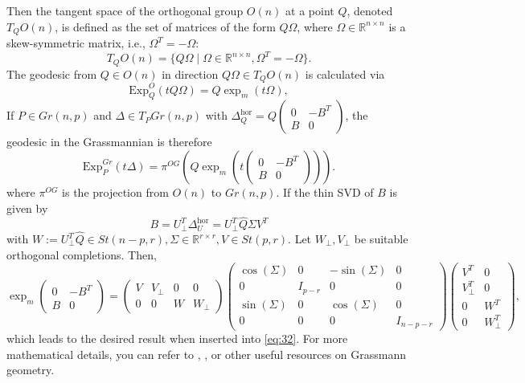 Then the tangent space of the orthogonal group \( O(n) \) at a point \( Q \), denoted \( T_Q O(n) \), is defined as the set of matrices of the form \( Q\Omega \), where \( \Omega \in \mathbb{R}^{n \times n} \) is a skew-symmetric matrix, i.e., \( \Omega^T = -\Omega \):
\begin{equation*}
    T_Q O(n) = \{ Q\Omega \mid \Omega \in \mathbb{R}^{n \times n}, \Omega^T = -\Omega \}.
\end{equation*}
The geodesic from \( Q \in O(n) \) in direction \( Q\Omega \in T_Q O(n) \) is calculated via 
\begin{equation}
    \text{Exp}_Q^O(tQ\Omega) = Q \exp_m(t\Omega),
\end{equation}
If \( P \in Gr(n,p) \) and \( \Delta \in T_P Gr(n,p) \) with \( \Delta^{\text{hor}}_Q = Q \begin{pmatrix} 0 & -B^T \\ B & 0 \end{pmatrix} \), the geodesic in the Grassmannian is therefore
\begin{equation}
\label{eq:32}
\text{Exp}^{Gr}_P(t\Delta) = \pi^{OG} \left( Q \exp_m \left( t \begin{pmatrix} 0 & -B^T \\ B & 0 \end{pmatrix} \right) \right).
\end{equation}
where \(\pi^{OG}\) is the projection from \(O(n)\) to \(Gr(n, p)\).
If the thin SVD of \( B \) is given by  
\begin{equation*}
B = U_\perp^T \Delta^{\text{hor}}_U = U_\perp^T \hat{Q} \Sigma V^T
\end{equation*}
with \( W := U_\perp^T \hat{Q} \in St(n-p, r), \Sigma \in \mathbb{R}^{r \times r}, V \in St(p, r) \). Let \( W_\perp, V_\perp \) be suitable orthogonal completions. Then, 
\begin{equation*}
\exp_m \begin{pmatrix} 0 & -B^T \\ B & 0 \end{pmatrix} = \begin{pmatrix} V & V_\perp & 0 & 0 \\ 0 & 0 & W & W_\perp \end{pmatrix} \begin{pmatrix} \cos(\Sigma) & 0 & -\sin(\Sigma) & 0 \\ 0 & I_{p-r} & 0 & 0 \\ \sin(\Sigma) & 0 & \cos(\Sigma) & 0 \\ 0 & 0 & 0 & I_{n-p-r} \end{pmatrix} \begin{pmatrix} V^T & 0 \\ V_\perp^T & 0 \\ 0 & W^T \\ 0 & W_\perp^T \end{pmatrix},
\end{equation*}
which leads to the desired result when inserted into \eqref{eq:32}. For more mathematical details, you can refer to \citet{edelman1998geometryalgorithmsorthogonalityconstraints}, \citet{Bendokat_2024}, or other useful resources on Grassmann geometry.


